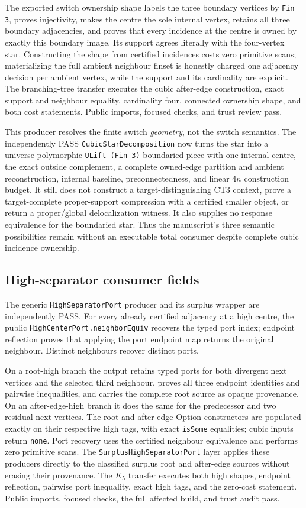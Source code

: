 \documentclass[11pt]{article}
\begin{document}
The exported switch ownership shape labels the three boundary vertices by
\texttt{Fin 3}, proves injectivity, makes the centre the sole internal vertex,
retains all three boundary adjacencies, and proves that every incidence at the
centre is owned by exactly this boundary image.  Its support agrees literally
with the four-vertex star.  Constructing the shape from certified incidences
costs zero primitive scans; materializing the full ambient neighbour finset is
honestly charged one adjacency decision per ambient vertex, while the support
and its cardinality are explicit.  The branching-tree transfer executes the
cubic after-edge construction, exact support and neighbour equality,
cardinality four, connected ownership shape, and both cost statements.  Public
imports, focused checks, and trust review pass.

This producer resolves the finite switch \emph{geometry}, not the switch
semantics.  The independently PASS \texttt{CubicStarDecomposition} now turns
the star into a universe-polymorphic \texttt{ULift (Fin 3)} boundaried piece
with one internal centre, the exact outside complement, a complete owned-edge
partition and ambient reconstruction, internal baseline, preconnectedness,
and linear $4n$ construction budget.  It still does not construct a
target-distinguishing CT3 context, prove a
target-complete proper-support compression with a certified smaller object, or
return a proper/global delocalization witness.  It also supplies no response
equivalence for the boundaried star.  Thus the manuscript's three semantic
possibilities remain without an executable total consumer despite complete
cubic incidence ownership.

\subsection*{High-separator consumer fields}
The generic \texttt{HighSeparatorPort} producer and its surplus wrapper are
independently PASS.  For every already certified adjacency at a high centre,
the public \texttt{HighCenterPort.neighborEquiv} recovers the typed port index;
endpoint reflection proves that applying the port endpoint map returns the
original neighbour.  Distinct neighbours recover distinct ports.

On a root-high branch the output retains typed ports for both divergent next
vertices and the selected third neighbour, proves all three endpoint
identities and pairwise inequalities, and carries the complete root source as
opaque provenance.  On an after-edge-high branch it does the same for the
predecessor and two residual next vertices.  The root and after-edge Option
constructors are populated exactly on their respective high tags, with exact
\texttt{isSome} equalities; cubic inputs return \texttt{none}.  Port recovery
uses the certified neighbour equivalence and performs zero primitive scans.
The \texttt{SurplusHighSeparatorPort} layer applies these producers directly
to the classified surplus root and after-edge sources without erasing their
provenance.  The $K_5$ transfer executes both high shapes, endpoint reflection,
pairwise port inequality, exact high tags, and the zero-cost statement.
Public imports, focused checks, the full affected build, and trust audit pass.
\end{document}
